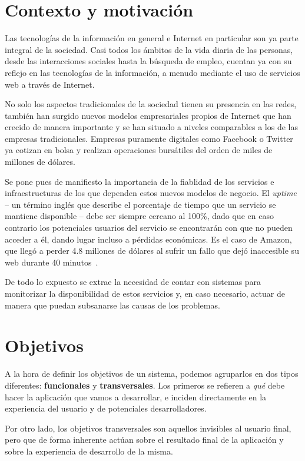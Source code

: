 \section{Contexto y motivación}
Las tecnologías de la información en general e Internet en particular son ya
parte integral de la sociedad. Casi todos los ámbitos de la vida diaria de las
personas, desde las interacciones sociales hasta la búsqueda de empleo, cuentan
ya con su reflejo en las tecnologías de la información, a menudo mediante el uso
de servicios web a través de Internet. 

No solo los aspectos tradicionales de la sociedad tienen su presencia en las
redes, también han surgido nuevos modelos empresariales propios de Internet que
han crecido de manera importante y se han situado a niveles comparables a los de
las empresas tradicionales. Empresas puramente digitales como Facebook o Twitter
ya cotizan en bolsa y realizan operaciones bursátiles del orden de miles de
millones de dólares.

Se pone pues de manifiesto la importancia de la fiablidad de los servicios e
infraestructuras de los que dependen estos nuevos modelos de negocio. El
\textit{uptime} -- un término inglés que describe el porcentaje de tiempo que un
servicio se mantiene disponible -- debe ser siempre cercano al 100\%, dado que
en caso contrario los potenciales usuarios del servicio se encontrarán con que
no pueden acceder a él, dando lugar incluso a pérdidas económicas. Es el caso de
Amazon, que llegó a perder 4.8 millones de dólares al sufrir un fallo que dejó
inaccesible su web durante 40 minutos~\cite{amazon}.

De todo lo expuesto se extrae la necesidad de contar con sistemas para
monitorizar la disponibilidad de estos servicios y, en caso necesario, actuar de
manera que puedan subsanarse las causas de los problemas.

\section{Objetivos}
\label{sec:objetivos}

A la hora de definir los objetivos de un sistema, podemos agruparlos
en dos tipos diferentes: \textbf{funcionales} y
\textbf{transversales}. Los primeros se refieren a \textit{qué} debe
hacer la aplicación que vamos a desarrollar, e inciden
directamente en la experiencia del usuario y de potenciales
desarrolladores.

Por otro lado, los objetivos transversales son aquellos invisibles al
usuario final, pero que de forma inherente actúan sobre el resultado
final de la aplicación y sobre la experiencia de desarrollo de la misma.

